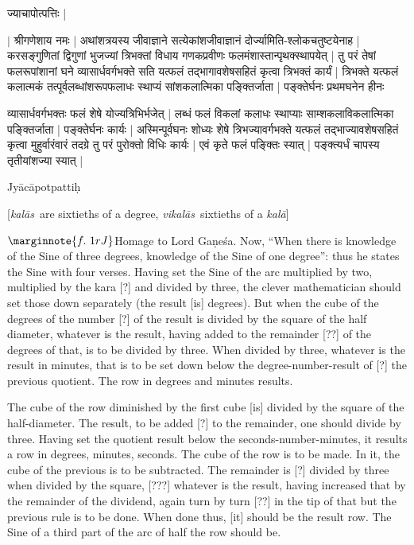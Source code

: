 \documentclass[12pt]{book}
\let\*=\d
\def\Ganesa{Ga\-\*ne\-\'sa}
\def\kala{\textit{ka\-l\=a}}
\def\kalas{\textit{ka\-l\=as}}
\def\vikalas{\textit{vi\-ka\-l\=as}}
\begin{document}
\begin{center}
{\s ज्याचापोत्पत्तिः |} \\
\end{center}
\bigskip

{\s $|$  श्रीगणेशाय नमः |
अथांशत्रयस्य जीवाज्ञाने सत्येकांशजीवाज्ञानं
दोर्ज्यामिति-श्लोकचतुष्टयेनाह |
करसङ्गुणितां द्विगुणां भुजज्यां
त्रिभक्तां विधाय
गणकप्रवीणः फलमंशास्तान्पृथक्स्थापयेत् |
तु परं तेषां फलरूपांशानां घने व्यासार्धवर्गभक्ते सति
यत्फलं तद्भागावशेषसहितं कृत्वा त्रिभक्तं कार्यं |
त्रिभक्ते यत्फलं कलात्मकं तत्पूर्वलब्धांशरूपफलाधः स्थाप्यं सांशकलात्मिका पङ्क्तिर्जाता |
पङ्क्तेर्घनः प्रथमघनेन हीनः 

व्यासार्धवर्गभक्तः फलं शेषे योज्यत्रिभिर्भजेत् |
लब्धं फलं विकलां कलाधः स्थाप्याः साम्शकलाविकलात्मिका
पङ्क्तिर्जाता |
पङ्क्तेर्घनः कार्यः | 
अस्मिन्पूर्वघनः शोध्यः शेषे त्रिभज्यावर्गभक्ते यत्फलं तद्भाज्यावशेषसहितं
कृत्वा मुहुर्वारंवारं तदग्रे तु परं पुरोक्तो विधिः कार्यः | एवं कृते फलं पङ्क्तिः स्यात् |
पङ्क्त्यर्धं चापस्य तृतीयांशज्या स्यात् | }

\newpage


\begin{center}
{Jyācāpotpattiḥ}
\end{center}

[\kalas\ are sixtieths of a degree, \vikalas\ sixtieths of a \kala]
\medskip

$\marginnote{f.~1r J}$Homage to Lord \Ganesa. Now, ``When there is knowledge of the Sine of three degrees,
knowledge of the Sine of one degree'': thus he states the Sine with four verses.
Having set the Sine of the arc multiplied by two, multiplied by the kara [?] and divided by three, the 
clever mathematician should set those down separately (the result [is] degrees). 
But when the cube of the degrees of the number [?] of the result is divided
by the square of the half diameter, whatever is the result, having added to the 
remainder [??] of the degrees of that, is to be divided by three. When divided by
three, whatever is the result in minutes, that is to be set down below the degree-number-result
of [?] the previous quotient. The row in degrees and minutes results. 

The cube of the row diminished by the first cube [is] divided by the square of the 
half-diameter. The result, to be added [?] to the remainder, one should divide by three.
Having set the quotient  result below the seconds-number-minutes, it results a row 
in degrees, minutes, seconds.  The cube of the row is to be made. In it, the cube of
the previous is to be subtracted. The remainder is [?] divided by three when divided
by the square, [???] whatever is the result, having increased that by the remainder
of the dividend, again turn by turn [??] in the tip of that but the previous rule is to be 
done. When done thus, [it] should be the result row.  The Sine of a third part of the 
arc  of half the row should be.
\end{document}
